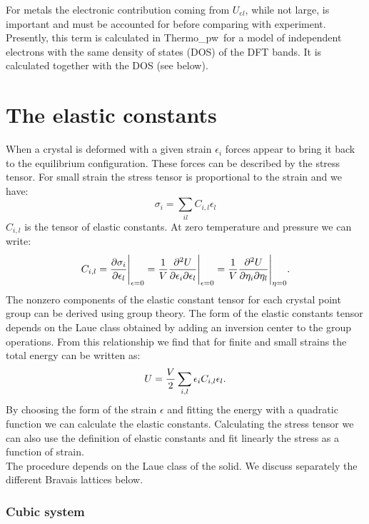 \documentclass[12pt,a4paper,twoside]{report}
\def\tpw{{\sc Thermo\_pw}}
\begin{document}
For metals the electronic contribution coming from $U_{el}$, while not large, 
is important 
and must be accounted for before comparing with experiment. Presently,
this term is calculated in \tpw\ for a model of independent electrons with
the same density of states (DOS) of the DFT bands. It is calculated together 
with the DOS (see below).

\newpage
{\color{dark-blue}\chapter{The elastic constants}}
\color{black}

When a crystal is deformed with a given strain $\epsilon_i$ forces
appear to bring it back to the equilibrium configuration. These
forces can be described by the stress tensor. For small strain the 
stress tensor is proportional to the strain and we have:
\begin{equation}
\sigma_{i} =\sum_{il} C_{i,l} \epsilon_l 
\end{equation}
$C_{i,l}$ is the tensor of elastic constants. 
At zero temperature and pressure we can write:
\begin{equation}
C_{i,l}= {\partial \sigma_i \over \partial \epsilon_{l}}\Bigg|_{\epsilon=0}=
{1 \over V}{\partial^2 U \over \partial \epsilon_i \partial \epsilon_l}
\Bigg|_{\epsilon=0} = 
{1 \over V}{\partial^2 U \over \partial \eta_i \partial \eta_l}
\Bigg|_{\eta=0}
.
\end{equation}
The nonzero components of the elastic constant tensor for each crystal point
group can be derived using group theory. The form of the elastic constants
tensor depends on the Laue class obtained by adding an inversion center to
the group operations. From this relationship we find that for finite
and small strains the total energy can be written as:
\begin{equation}
U= {V \over 2} \sum_{i,l} \epsilon_i C_{i,l} \epsilon_l.
\end{equation}
By choosing the form of the strain $\epsilon$ and fitting the
energy with a quadratic function we can calculate the elastic constants.
Calculating the stress tensor we can also use the definition
of elastic constants and fit linearly the stress as a function of strain. \\
The procedure depends on the Laue class of the solid. We discuss separately
the different Bravais lattices below.

{\color{web-blue}\subsection{Cubic system}}
\color{black}
\end{document}
